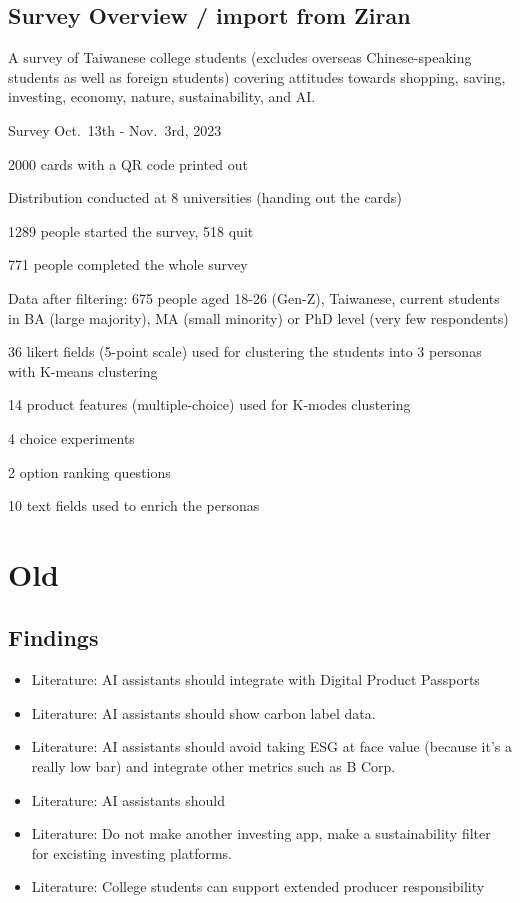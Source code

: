 \documentclass[
  letterpaper,
  DIV=11,
  numbers=noendperiod]{scrartcl}
\providecommand{\tightlist}{%
  \setlength{\itemsep}{0pt}\setlength{\parskip}{0pt}}\usepackage{longtable,booktabs,array}
\begin{document}
\subsection{Survey Overview / import from
Ziran}\label{survey-overview-import-from-ziran}

A survey of Taiwanese college students (excludes overseas
Chinese-speaking students as well as foreign students) covering
attitudes towards shopping, saving, investing, economy, nature,
sustainability, and AI.

Survey Oct.~13th - Nov.~3rd, 2023

2000 cards with a QR code printed out

Distribution conducted at 8 universities (handing out the cards)

1289 people started the survey, 518 quit

771 people completed the whole survey

Data after filtering: 675 people aged 18-26 (Gen-Z), Taiwanese, current
students in BA (large majority), MA (small minority) or PhD level (very
few respondents)

36 likert fields (5-point scale) used for clustering the students into 3
personas with K-means clustering

14 product features (multiple-choice) used for K-modes clustering

4 choice experiments

2 option ranking questions

10 text fields used to enrich the personas

\section{Old}\label{old}

\subsection{Findings}\label{findings}

\begin{itemize}
\tightlist
\item
  Literature: AI assistants should integrate with Digital Product
  Passports
\item
  Literature: AI assistants should show carbon label data.
\item
  Literature: AI assistants should avoid taking ESG at face value
  (because it's a really low bar) and integrate other metrics such as B
  Corp.
\item
  Literature: AI assistants should
\item
  Literature: Do not make another investing app, make a sustainability
  filter for excisting investing platforms.
\item
  Literature: College students can support extended producer
  responsibility
\end{itemize}
\end{document}
